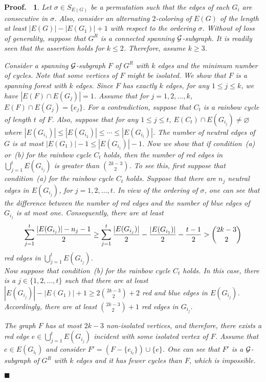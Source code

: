 \documentclass[11pt]{article}
\newtheorem{preproof}{{\bf Proof.\ }}
\newenvironment{proof}[1]{\begin{preproof}{\rm
               #1}\hfill{$\blacksquare$}}{\end{preproof}}
\begin{document}
\begin{proof}{
Let $\sigma \in S_{E(G)}$ be a permutation
such that the edges of each $G_i$ are consecutive in $\sigma$. Also, consider an alternating $2$-coloring
of $E(G)$ of the length at least $|E(G)|-|E(G_1)|+1$ with respect to the ordering $\sigma$.
Without of loss of generality, suppose that $G^R$ is a connected spanning ${\cal G}$-subgraph. 
It is readily seen that the assertion holds for $k\leq 2$. Therefore, assume $k\geq 3$. 

Consider a spanning ${\cal G}$-subgraph $F$ of $G^R$ with $k$  edges and the minimum number of cycles. Note that some vertices of 
$F$ might be isolated.  
We show that $F$ is a spanning forest with $k$ edges. 
Since $F$ has exactly $k$ edges,  for any $1\leq j\leq k$, we have $|E(F)\cap E(G_{j})|=1$.
Assume that for $j=1,2,\ldots,k$, $E(F)\cap E(G_{j})=\{e_j\}$.  
For a contradiction, suppose that $C_t$ is a rainbow cycle of length $t$ of $F$. 
Also, suppose that  for any $1\leq j\leq t$, 
$E(C_t)\cap E(G_{i_j})\not=\varnothing$ where $|E(G_{i_1})|\leq |E(G_{i_2})|\leq \cdots \leq |E(G_{i_t})|$. 
The number of neutral edges of $G$ is at most $|E(G_1)|-1\leq |E(G_{i_1})|-1$. Now we show that if condition~(a) or~(b) 
for the rainbow cycle $C_t$ holds, then the number of red edges in  
$\bigcup_{j=1}^t E(G_{i_j})$ is greater than ${2k-3\choose 2}$. 
To see this, first suppose that condition~(a) for the 
rainbow cycle $C_t$ holds. 
Suppose that there are $n_j$ neutral edges in $E(G_{i_j})$, for $j=1,2,\ldots,t$. In view of the ordering of $\sigma$, one can see that the difference between the number of red edges and the number of blue edges of $G_{i_j}$ is at most one. Consequently, 
there are at least 
$$\sum_{j=1}^t{|E(G_{i_j})|-n_j-1\over 2}\geq \sum_{j=1}^t{|E(G_{i_j})|\over 2}-{|E(G_{i_1})|\over 2}-{t-1\over 2}> {2k-3\choose 2}$$
red edges in $\bigcup_{j=1}^t E(G_{i_j})$.\\
Now suppose that condition~(b) for the 
rainbow cycle $C_t$ holds. 
In this case, there is a $j\in\{1,2,\ldots,t\}$ such that 
there are at least $|E(G_{i_j})|-|E(G_1)|+1\geq 2\displaystyle {2k-3\choose 2}+2$ red and blue edges in $E(G_{i_j})$.
Accordingly, there are at least $\displaystyle {2k-3\choose 2}+1$ red edges in $G_{i_j}$.

The graph $F$ has at most $2k-3$ non-isolated vertices, and therefore, there exists a red edge $e\in \bigcup_{j=1}^t E(G_{i_j})$ incident with some isolated vertex of $F$. Assume that $e\in E(G_{i_l})$ and consider 
$F'=(F- \{e_{i_l}\})\cup \{e\}$. One can see that $F'$ is a ${\cal G}$-subgraph of $G^R$ with $k$ edges and it has 
fewer cycles than $F$, which is impossible.
}\end{proof}
\end{document}
